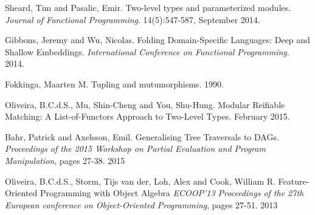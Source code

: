 \documentclass[nocopyrightspace]{sigplanconf}
\begin{document}
\begin{thebibliography}{}
\softraggedright

  Sheard, Tim and Pasalic, Emir.
  Two-level types and parameterized modules.
  \emph{Journal of Functional Programming}.
  14(5):547-587, September 2014.

  Gibbons, Jeremy and Wu, Nicolas.
  Folding Domain-Specific Languages: Deep and Shallow Embeddings.
  \emph{International Conference on Functional Programming}.
  2014.

  Fokkinga, Maarten M.
  Tupling and mutumorphisms.
  1990.

  Oliveira, B.C.d.S., Mu, Shin-Cheng and You, Shu-Hung.
  Modular Reifiable Matching: A List-of-Functors Approach to Two-Level Types.
  February 2015.

  Bahr, Patrick and Axelsson, Emil.
  Generalising Tree Traversals to DAGs.
  \emph{Proceedings of the 2015 Workshop on Partial Evaluation and Program Manipulation},
  pages 27-38.
  2015

  Oliveira, B.C.d.S., Storm, Tijs van der, Loh, Alex and Cook, William R.
  Feature-Oriented Programming with Object Algebra
  \emph{ECOOP'13 Proceedings of the 27th European conference on Object-Oriented Programming},
  pages 27-51.
  2013


\end{thebibliography}
\end{document}
